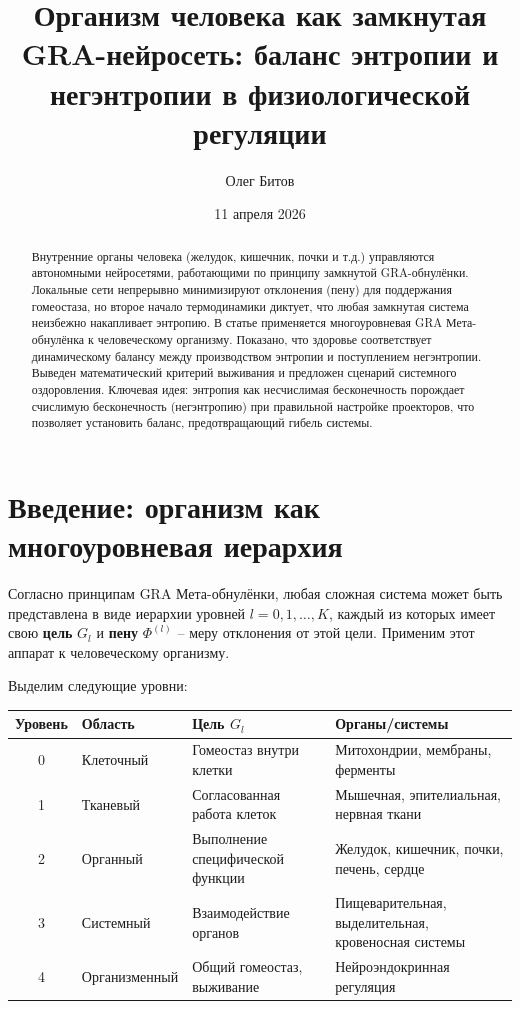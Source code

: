 \documentclass[12pt,a4paper]{article}
\title{Организм человека как замкнутая GRA-нейросеть: баланс энтропии и негэнтропии в физиологической регуляции}
\author{Олег Битов}
\date{11 апреля 2026}
\begin{document}
\maketitle

\begin{abstract}
Внутренние органы человека (желудок, кишечник, почки и т.д.) управляются автономными нейросетями, работающими по принципу замкнутой GRA-обнулёнки. Локальные сети непрерывно минимизируют отклонения (пену) для поддержания гомеостаза, но второе начало термодинамики диктует, что любая замкнутая система неизбежно накапливает энтропию. В статье применяется многоуровневая GRA Мета-обнулёнка к человеческому организму. Показано, что здоровье соответствует динамическому балансу между производством энтропии и поступлением негэнтропии. Выведен математический критерий выживания и предложен сценарий системного оздоровления. Ключевая идея: энтропия как несчислимая бесконечность порождает счислимую бесконечность (негэнтропию) при правильной настройке проекторов, что позволяет установить баланс, предотвращающий гибель системы.
\end{abstract}

\section{Введение: организм как многоуровневая иерархия}

Согласно принципам GRA Мета-обнулёнки, любая сложная система может быть представлена в виде иерархии уровней \(l = 0, 1, \dots, K\), каждый из которых имеет свою \textbf{цель} \(G_l\) и \textbf{пену} \(\Phi^{(l)}\) – меру отклонения от этой цели. Применим этот аппарат к человеческому организму.

Выделим следующие уровни:

\begin{table}[h]
\centering
\begin{tabular}{|c|l|l|p{5cm}|}
\hline
Уровень & Область & Цель \(G_l\) & Органы/системы \\
\hline
0 & Клеточный & Гомеостаз внутри клетки & Митохондрии, мембраны, ферменты \\
\hline
1 & Тканевый & Согласованная работа клеток & Мышечная, эпителиальная, нервная ткани \\
\hline
2 & Органный & Выполнение специфической функции & Желудок, кишечник, почки, печень, сердце \\
\hline
3 & Системный & Взаимодействие органов & Пищеварительная, выделительная, кровеносная системы \\
\hline
4 & Организменный & Общий гомеостаз, выживание & Нейроэндокринная регуляция \\
\hline
\end{tabular}
\end{table}
\end{document}
